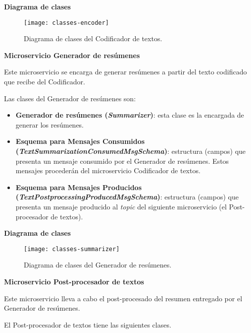 \noindent
\textbf{Diagrama de clases}

\begin{figure}[h]
	\centering
	\texttt{[image: classes-encoder]}
	\vspace{-0.5cm}
	\caption{Diagrama de clases del Codificador de textos.}
\end{figure}


\noindent
\textbf{\large Microservicio Generador de resúmenes}

Este microservicio se encarga de generar resúmenes a partir del texto codificado que recibe del Codificador.

Las clases del Generador de resúmenes son:

\vspace{-0.2cm}
\begin{itemize} [\textbullet]
	\item \textbf{Generador de resúmenes (\emph{Summarizer})}: esta clase es la encargada de generar los resúmenes.
	
	\item \textbf{Esquema para Mensajes Consumidos \\ (\emph{TextSummarizationConsumedMsgSchema})}: estructura (campos) que presenta un mensaje consumido por el Generador de resúmenes. Estos mensajes procederán del microservicio Codificador de textos.
	
	\item \textbf{Esquema para Mensajes Producidos \\ (\emph{TextPostprocessingProducedMsgSchema})}: estructura (campos) que presenta un mensaje producido al \emph{topic} del siguiente microservicio (el Post-procesador de textos).
\end{itemize}

\noindent
\textbf{Diagrama de clases}

\begin{figure}[h]
	\centering
	\texttt{[image: classes-summarizer]}
	\vspace{-0.5cm}
	\caption{Diagrama de clases del Generador de resúmenes.}
\end{figure}



\noindent
\textbf{\large Microservicio Post-procesador de textos}

Este microservicio lleva a cabo el post-procesado del resumen entregado por el Generador de resúmenes.

El Post-procesador de textos tiene las siguientes clases.

